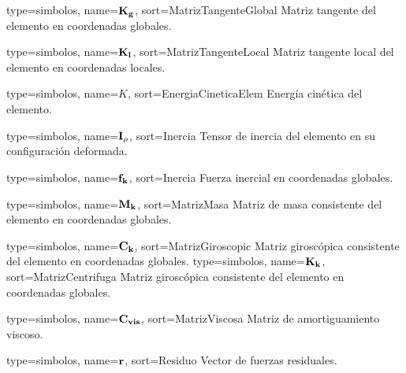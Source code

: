 {
	type={simbolos},
	name={$\bf{K_g}$}, %
	sort={MatrizTangenteGlobal} %
}
{Matriz tangente del elemento en coordenadas globales.}

{
	type={simbolos},
	name={$\bf{K_l}$}, %
	sort={MatrizTangenteLocal} %
}
{Matriz tangente local del elemento en coordenadas locales.}

{
	type={simbolos},
	name={$K$}, %
	sort={EnergiaCineticaElem} %
}
{Energía cinética del elemento.}


{
	type={simbolos},
	name={$\bf{I_{\rho}}$}, %
	sort={Inercia} %
}
{Tensor de inercia del elemento en su configuración deformada.}

{
	type={simbolos},
	name={$\bf{f_k}$}, %
	sort={Inercia} %
}
{Fuerza inercial en coordenadas globales.}

{
	type={simbolos},
	name={$\bf{M_k}$}, %
	sort={MatrizMasa} %
}
{Matriz de masa consistente del elemento en coordenadas globales.}

{
	type={simbolos},
	name={$\bf{C}_k$}, %
	sort={MatrizGiroscopic} %
}
{Matriz giroscópica consistente del elemento en coordenadas globales.}
{
	type={simbolos},
	name={$\bf{K}_k$}, %
	sort={MatrizCentrifuga} %
}
{Matriz giroscópica consistente del elemento en coordenadas globales.}

{
	type={simbolos},
	name={$\bf{C}_{vis}$}, %
	sort={MatrizViscosa} %
}
{Matriz de amortiguamiento viscoso.}

{
	type={simbolos},
	name={$\bf{r}$}, %
	sort={Residuo} %
}
{Vector de fuerzas residuales.}


